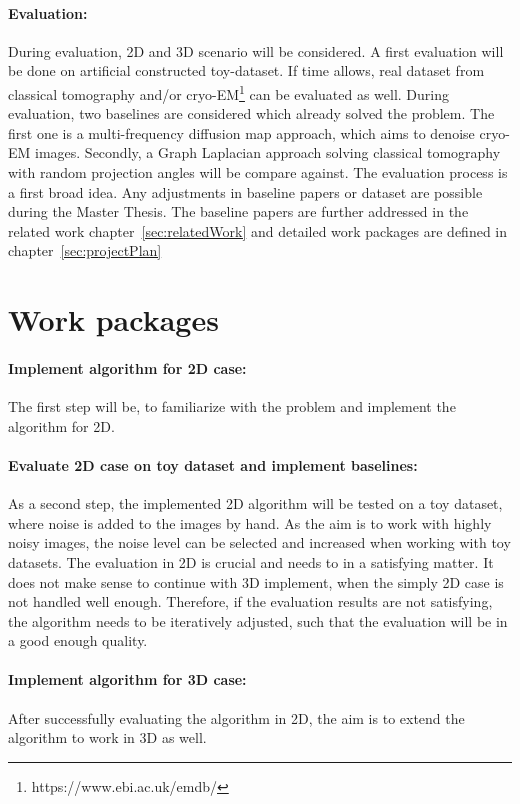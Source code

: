 \paragraph{Evaluation:}
During evaluation, 2D and 3D scenario will be considered. A first evaluation will be done on artificial constructed
toy-dataset. If time allows, real dataset from classical tomography and/or cryo-EM\footnote{https://www.ebi.ac.uk/emdb/} can be evaluated as well.
During evaluation, two baselines are considered which already solved the problem. The first one is a multi-frequency diffusion 
map approach\cite{multiDiffusionMaps, cryoEmMutliDM}, which aims to denoise cryo-EM images. 
Secondly, \cite{LaplaceRandomProjections} a Graph Laplacian approach solving classical tomography with random projection angles will be compare against.
The evaluation process is a first broad idea. Any adjustments in baseline papers or dataset are possible during 
the Master Thesis. The baseline papers are further addressed in the related work chapter~\ref{sec:relatedWork}
and detailed work packages are defined in chapter~\ref{sec:projectPlan}


\section{Work packages}

\paragraph{Implement algorithm for 2D case:}
The first step will be, to familiarize with the problem and implement
the algorithm for 2D. 

\paragraph{Evaluate 2D case on toy dataset and implement baselines:}
As a second step, the implemented 2D algorithm will be tested on a toy dataset,
where noise is added to the images by hand. As the aim is to work with highly noisy images,
the noise level can be selected and increased when working with toy datasets. 
The evaluation in 2D is crucial and needs to in a satisfying matter. 
It does not make sense to continue with 3D implement, when the simply 2D case is not handled well enough.
Therefore, if the evaluation results are not satisfying, the algorithm needs to be iteratively adjusted, 
such that the evaluation will be in a good enough quality.


\paragraph{Implement algorithm for 3D case:}
After successfully evaluating the algorithm in 2D, the aim is to extend the algorithm to work in 3D as well.

